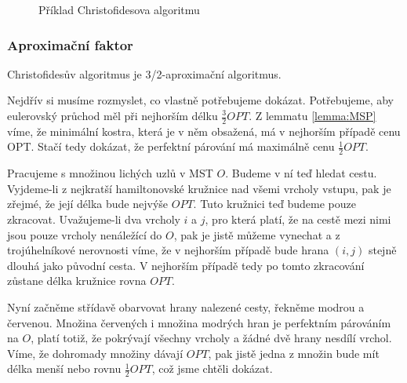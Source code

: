 \documentclass[
  printversion=false,
  joinlists=true,
  glossaries=true,
  figures=true,
  tables=true,
  sourcecodes=false,
  theorems=false,
  bibencoding=utf8,
  language=czech,
  encoding=utf8,
  program=infpvs,
  index=true,
  biblatex=true
]{kidiplom}
\begin{document}
\begin{figure}[H]
\begin{example}
    \end{example}
    \caption{Příklad Christofidesova algoritmu}
\end{figure}

\subsubsection{Aproximační faktor}
\begin{theorem}
	Christofidesův algoritmus  je 3/2-aproximační algoritmus.
\end{theorem}

	Nejdřív si musíme rozmyslet, co vlastně potřebujeme dokázat. Potřebujeme, aby eulerovský průchod měl při nejhorším délku $\frac{3}{2}OPT$. Z lemmatu \ref{lemma:MSP} víme, že minimální kostra, která je v něm obsažená, má v nejhorším případě cenu OPT. Stačí tedy dokázat, že perfektní párování má maximálně cenu $\frac{1}{2} OPT$.
	
	Pracujeme s množinou lichých uzlů v MST $O$. Budeme v ní teď hledat cestu. Vyjdeme-li z nejkratší hamiltonovské kružnice nad všemi vrcholy vstupu, pak je zřejmé, že její délka bude nejvýše $OPT$. Tuto kružnici teď budeme pouze zkracovat. Uvažujeme-li dva vrcholy $i$ a $j$, pro která platí, že na cestě mezi nimi jsou pouze vrcholy nenáležící do $O$, pak je jistě můžeme vynechat a z trojúhelníkové nerovnosti víme, že v nejhorším případě bude hrana $(i,j)$ stejně dlouhá jako původní cesta. V nejhorším případě tedy po tomto zkracování zůstane délka kružnice rovna $OPT$.
	
	Nyní začněme střídavě obarvovat hrany nalezené cesty, řekněme modrou a červenou. Množina červených i množina modrých hran je perfektním párováním na $O$, platí totiž, že pokrývají všechny vrcholy a žádné dvě hrany nesdílí vrchol. Víme, že dohromady množiny dávají $OPT$, pak jistě jedna z množin bude mít délka menší nebo rovnu $\frac{1}{2}OPT$, což jsme chtěli dokázat.
\end{document}
